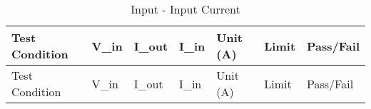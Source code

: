 \begin{longtable}{lllllll}
\caption{Input - Input Current} \\
\hline
Test Condition & V_in & I_out & I_in & Unit (A) & Limit & Pass/Fail \\
\hline
\endfirsthead

\hline
Test Condition & V_in & I_out & I_in & Unit (A) & Limit & Pass/Fail \\
\hline
\endhead


\hline
\end{longtable}